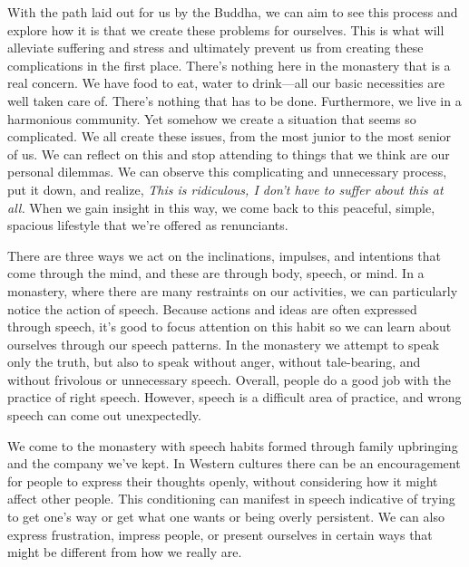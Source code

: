 With the path laid out for us by the Buddha, we can aim to see this 
process and explore how it is that we create these problems for 
ourselves. This is what will alleviate suffering and stress and 
ultimately prevent us from creating these complications in the first 
place. There's nothing here in the monastery that is a real concern. We 
have food to eat, water to drink---all our basic necessities are well 
taken care of. There's nothing that has to be done. Furthermore, we 
live in a harmonious community. Yet somehow we create a situation that 
seems so complicated. We all create these issues, from the most junior 
to the most senior of us. We can reflect on this and stop attending to 
things that we think are our personal dilemmas. We can observe this 
complicating and unnecessary process, put it down, and realize, 
\emph{This is ridiculous, I don't have to suffer about this at all.} 
When we gain insight in this way, we come back to this peaceful, 
simple, spacious lifestyle that we're offered as renunciants.


There are three ways we act on the inclinations, impulses, and 
intentions that come through the mind, and these are through body, 
speech, or mind. In a monastery, where there are many restraints on our 
activities, we can particularly notice the action of speech. Because 
actions and ideas are often expressed through speech, it's good to 
focus attention on this habit so we can learn about ourselves through 
our speech patterns. In the monastery we attempt to speak only the 
truth, but also to speak without anger, without tale-bearing, and 
without frivolous or unnecessary speech. Overall, people do a good job 
with the practice of right speech. However, speech is a difficult area 
of practice, and wrong speech can come out unexpectedly.

We come to the monastery with speech habits formed through family 
upbringing and the company we've kept. In Western cultures there can be 
an encouragement for people to express their thoughts openly, without 
considering how it might affect other people. This conditioning can 
manifest in speech indicative of trying to get one's way or get what 
one wants or being overly persistent. We can also express frustration, 
impress people, or present ourselves in certain ways that might be 
different from how we really are.

